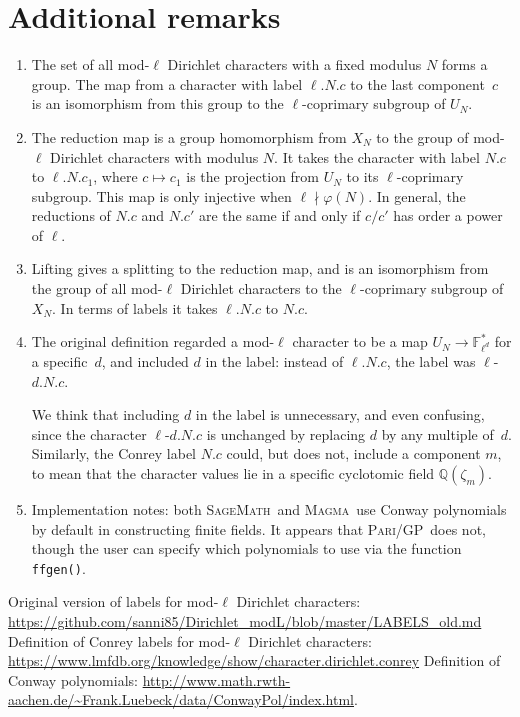 \documentclass[a4paper, 10pt]{amsart}
\def\Q{{\mathbb Q}}
\def\Fld{{\mathbb F}_{\ell^d}}
\newcommand{\software}[1]{\textsc{#1}{}}
\newcommand{\Sage}{\software{SageMath}}
\newcommand{\Magma}{\software{Magma}}
\newcommand{\GP}{\software{Pari/GP}}
\newcommand{\CLab}[2]{$#1.#2$}
\newcommand{\DLab}[3]{$#1.#2.#3$}   %
\newcommand{\oldDLab}[4]{$#1$-$#2.#3.#4$}
\begin{document}
\section{Additional remarks}
\begin{enumerate}
\item
  The set of all mod-$\ell$ Dirichlet characters with a fixed modulus
  $N$ forms a group.  The map from a character with label
  \DLab{\ell}{N}{c} to the last component~$c$ is an isomorphism from
  this group to the $\ell$-coprimary subgroup of $ U_N$.
\item
  The reduction map is a group homomorphism from $X_N$ to the group
  of mod-$\ell$ Dirichlet characters with modulus $N$.  It takes the
  character with label \CLab{N}{c} to \DLab{\ell}{N}{c_1}, where
  $c\mapsto c_1$ is the projection from $ U_N$ to its $\ell$-coprimary
  subgroup.  This map is only injective when $\ell\nmid\varphi(N)$.
  In general, the reductions of \CLab{N}{c} and \CLab{N}{c'} are the
  same if and only if $c/c'$ has order a power of $\ell$.
\item
  Lifting gives a splitting to the reduction map, and is an
  isomorphism from the group of all mod-$\ell$ Dirichlet characters to
  the $\ell$-coprimary subgroup of $X_N$. In terms of labels it
  takes \DLab{\ell}{N}{c} to \CLab{N}{c}.
\item
  The original definition regarded a mod-$\ell$ character to be a map
  $ U_N\to\Fld^*$ for a specific~$d$, and included $d$ in the label:
  instead of \DLab{\ell}{N}{c}, the label was \oldDLab{\ell}{d}{N}{c}.

  We think that including $d$ in the label is unnecessary, and even
  confusing, since the character \oldDLab{\ell}{d}{N}{c} is unchanged
  by replacing $d$ by any multiple of~$d$.  Similarly, the Conrey
  label \CLab{N}{c} could, but does not, include a component $m$,
  to mean that the character values lie in a specific cyclotomic field
  $\Q(\zeta_m)$.

\item
  Implementation notes: both \Sage\ and \Magma\ use Conway polynomials
  by default in constructing finite fields.  It appears that \GP\ does
  not, though the user can specify which polynomials to use via the
  function \texttt{ffgen()}.
\end{enumerate}

\begin{thebibliography}{99}
 Original version of labels for mod-$\ell$ Dirichlet
  characters:
  \url{https://github.com/sanni85/Dirichlet_modL/blob/master/LABELS_old.md}
  Definition of Conrey labels for mod-$\ell$ Dirichlet characters:
  \url{https://www.lmfdb.org/knowledge/show/character.dirichlet.conrey}
 Definition of Conway polynomials:
  \url{http://www.math.rwth-aachen.de/~Frank.Luebeck/data/ConwayPol/index.html}.
\end{thebibliography}
\end{document}
